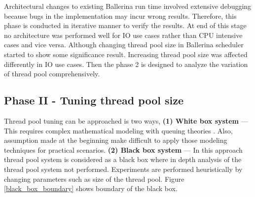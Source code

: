 Architectural changes to existing Ballerina run time involved extensive debugging because bugs in the implementation may incur wrong results. Therefore, this phase is conducted in iterative manner to verify the results.
At end of this stage no architecture was performed well for IO use cases rather than CPU intensive cases and vice versa. Although changing thread pool size in Ballerina scheduler started to show some significance result. Increasing thread pool size was affected differently in IO use cases. Then the phase 2 is designed to analyze the variation of thread pool comprehensively.

\subsection{Phase II - Tuning thread pool size}

Thread pool tuning can be approached is two ways, \textbf{(1) White box system} — This requires complex mathematical modeling with queuing theories \cite{math_aproach_thread_pool_tuning}. Also, assumption made at the beginning make difficult to apply those modeling techniques for practical scenarios. \textbf{(2) Black box system} — In this approach thread pool system is considered as a black box where in depth analysis of the thread pool system not performed. Experiments are performed heuristically by changing parameters such as size of the thread pool. Figure \ref{black_box_boundary} shows boundary of the black box.

